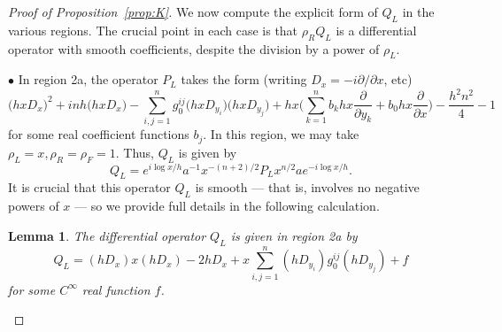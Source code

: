 \documentclass[10pt, a4paper, twoside]{amsart}
\numberwithin{equation}{section}
\newtheorem{lemma}[theorem]{Lemma}
\theoremstyle{remark}
\begin{document}
\begin{proof}[Proof of Proposition~\ref{prop:K}]
We now compute the explicit form of $Q_L$ in the various regions. 
The crucial point in each case is that $\rho_R Q_L$ is a differential operator with smooth coefficients, despite the division by a power of $\rho_L$. 

$\bullet$ In region 2a, the operator $P_L$ takes the form (writing $D_x = - i \partial/\partial x$, etc)
\begin{equation}
 \big(hx D_x\big)^2 +  in h \big(hx D_x \big) - \sum_{i, j = 1}^n g_0^{i j}\big(h x D_{y_i}\big)\big(h x D_{y_j}\big) + hx \bigg( \sum_{k = 1}^n b_k hx \frac{\partial}{\partial y_k} + b_0 hx \frac{\partial}{\partial x} \bigg) - \frac{h^2 n^2}{4} - 1
\label{Pl2a}\end{equation}
for some real coefficient functions $b_j$. 
In this region, we may take $\rho_L = x, \rho_R =  \rho_F = 1$. Thus, $Q_L$ is given by 
$$
Q_L = e^{i\log x/h} a^{-1} x^{-(n+2)/2} P_L x^{n/2} a e^{-i\log x/h}.
$$
It is crucial that this operator $Q_L$ is smooth --- that is, involves no negative powers of $x$ --- so we provide full details in the following  calculation. 

\begin{lemma}\label{lem:Ql} The differential operator $Q_L$ is given in region 2a by
\begin{equation}
Q_L = 
 (hD_x) x (hD_x) - 2 h D_x + 
 x\sum_{i, j = 1}^n (h  D_{y_i}) g_0^{ij} (h  D_{y_j})  + f
\label{Ql}\end{equation}
for some $C^\infty$ real function $f$. 
\end{lemma}


\end{proof}
\end{document}
